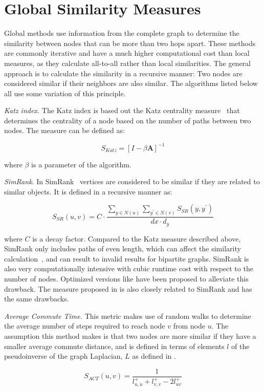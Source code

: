 \section{Global Similarity Measures}

Global methods use information from the complete graph to determine the
similarity between nodes that can be more than two hops apart. These methods
are commonly iterative and have a much higher computational cost than local
measures, as they calculate all-to-all rather than local similarities.
The general approach is to calculate the similarity in a recursive manner:
Two nodes are considered similar if their neighbors are also similar.
The algorithms listed below all use some variation of this principle.

\emph{Katz index.} The Katz index \cite{vertex-similarity-survey} is based out the Katz centrality
measure~\cite{katz-index} that determines the centrality of a node
based on the number of paths between two nodes. The measure can be
defined as:

\begin{equation}
	S_{Katz} = [I - \beta \mathbf{A}]^{-1}
\end{equation}

\noindent
where $\beta$ is a parameter of the algorithm.

\emph{SimRank}. In SimRank~\cite{simrank} vertices are considered
to be similar if they are related to similar objects. It is defined
in a recursive manner as:

\begin{equation}
	S_{SR}(u, v)= C \cdot \frac{\sum_{y \in N(u)} \sum_{y^{\prime} \in N(v)} S_{SR}(y, y^{\prime})}{d{x} \cdot d_{y}}
\end{equation}

\noindent
where $C$ is a decay factor. Compared to the Katz measure described above,
SimRank only includes paths of even length, which can affect the similarity
calculation~\cite{vertex-similarity-survey}, and can result to invalid results
for bipartite graphs. SimRank is also very computationally intensive with cubic
runtime cost with respect to the number of nodes. Optimized versions like
\cite{simrankOpt} have been proposed to alleviate this drawback.
The measure proposed in \citet{blondel-similarity} is also closely related to SimRank
and has the same drawbacks.

\emph{Average Commute Time.} This metric makes use of random walks to determine
the average number of steps required to reach node $v$ from node $u$. The assumption
this method makes is that two nodes are more similar if they have a smaller average
commute distance, and is defined in terms of elements $l$ of the pseudoinverse of the
graph Laplacian, $L$ as defined in \cite{link-prediction-survey}.

\begin{equation}
	S_{ACT}(u, v)=\frac{1}{l_{u, u}^{+}+l_{v, v}^{+}-2 l_{uv}^{+}}
\end{equation}
